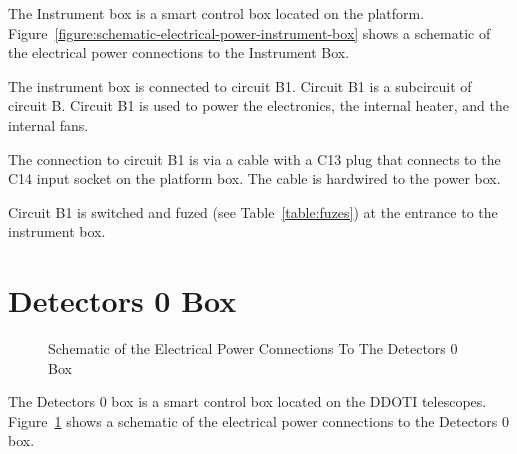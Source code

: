 The Instrument box is a smart control box located on the platform. Figure~\ref{figure:schematic-electrical-power-instrument-box} shows a schematic of the electrical power connections to the Instrument Box.

The instrument box is connected to circuit B1. Circuit B1 is a subcircuit of circuit B. Circuit B1 is used to power the electronics, the internal heater, and the internal fans.

The connection to circuit B1 is via a cable with a C13 plug that connects to the C14 input socket on the platform box. The cable is hardwired to the power box.

Circuit B1 is switched and fuzed (see Table~\ref{table:fuzes}) at the entrance to the instrument box.

\fi

\ifddoti

\section{Detectors 0 Box}

\begin{figure}
\begin{center}
\footnotesize 
{}
\end{center}
\caption{Schematic of the Electrical Power Connections To The Detectors 0 Box}
\label{figure:schematic-electrical-power-detectors0-box}
\end{figure}

The Detectors 0 box is a smart control box located on the DDOTI telescopes. Figure~\ref{figure:schematic-electrical-power-detectors0-box} shows a schematic of the electrical power connections to the Detectors 0 box.

